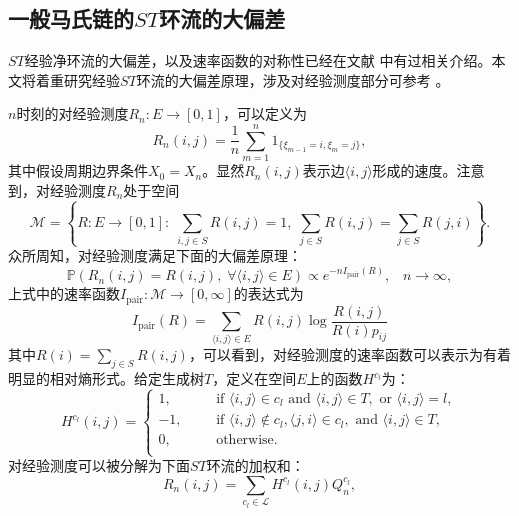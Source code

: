 \subsection{一般马氏链的$ST$环流的大偏差}

$ST$经验净环流的大偏差，以及速率函数的对称性已经在文献 \cite{bertini2015flows} 中有过相关介绍。本文将着重研究经验$ST$环流的大偏差原理，涉及对经验测度部分可参考 \cite{den2008large}。

$n$时刻的对经验测度$R_n:E\rightarrow[0,1]$，可以定义为
\begin{equation*}
R_n(i,j) = \frac{1}{n}\sum_{m=1}^n1_{\{\xi_{m-1}=i,\xi_m=j\}},
\end{equation*}
其中假设周期边界条件$X_0 = X_n$。显然$R_n(i,j)$表示边$\langle i,j\rangle$形成的速度。注意到，对经验测度$R_n$处于空间
\begin{equation*}
\mathcal{M} = \left\{R:E\rightarrow[0,1]:\;\sum_{i,j\in S}R(i,j) = 1,\;
\sum_{j\in S}R(i,j)=\sum_{j\in S}R(j,i)\right\}.
\end{equation*}
众所周知，对经验测度满足下面的大偏差原理：
\begin{equation*}
\mathbb{P}(R_n(i,j)=R(i,j),\;\forall\langle i,j\rangle\in E)\propto e^{-nI_{\mathrm{pair}}(R)},\;\;\;n\to\infty,
\end{equation*}
上式中的速率函数$I_{\mathrm{pair}}:\mathcal{M}\rightarrow[0,\infty]$的表达式为
\begin{equation*}
I_{\mathrm{pair}}(R) = \sum_{\langle i,j\rangle\in E}R(i,j)\log\frac{R(i,j)}{R(i)p_{ij}}
\end{equation*}
其中$R(i)=\sum_{j\in S}R(i,j)$，可以看到，对经验测度的速率函数可以表示为有着明显的相对熵形式。给定生成树$T$，定义在空间$E$上的函数$H^{c_l}$为：
\begin{equation*}\label{cycle function2}
H^{c_l}(i,j)
    =\left\{\begin{aligned}
    1, &   && \text{if } \langle i,j\rangle \in c_l \text{ and }\langle i,j\rangle \in T, \text{ or } \langle i,j\rangle=l,\\
    -1,&   && \text{if } \langle i,j\rangle\notin c_l,\langle j,i\rangle \in c_l,\text{ and }\langle i,j\rangle \in T,\\
    0, &   && \text{otherwise}.\\
    \end{aligned}\right.
\end{equation*}
对经验测度可以被分解为下面$ST$环流的加权和：
\begin{equation*}
R_n(i,j) = \sum_{c_l\in\mathcal{L}}H^{c_l}(i,j)Q^{c_l}_n,
\end{equation*}

